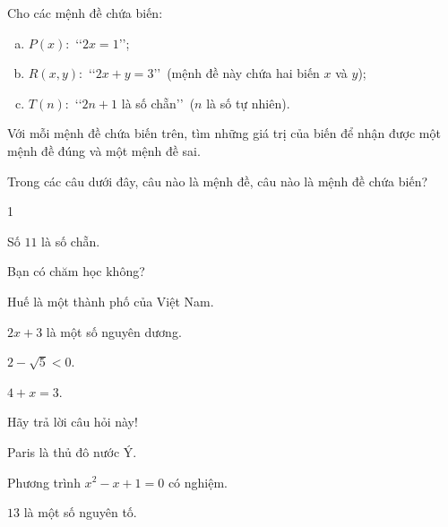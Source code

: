 \begin{bt}%
	Cho  các mệnh đề chứa biến:
	\begin{enumerate}[a)]
		\item $P(x)\colon$ \lq\lq$2x=1$\rq\rq; 
		\item $R(x,y)\colon$ \lq\lq$2x+y=3$\rq\rq\,  (mệnh đề này chứa hai biến $x$ và $y$);
		\item $T(n)\colon$ \lq\lq $2n+1$ là số chẵn\rq\rq\, ($n$ là số tự nhiên). 
	\end{enumerate}
	Với mỗi mệnh đề chứa biến  trên, tìm những giá trị của biến để nhận được một mệnh đề đúng và một mệnh đề sai.
\end{bt}

\begin{bt}%
	Trong các câu dưới đây, câu nào là mệnh đề, câu nào là mệnh đề  chứa biến?
	\begin{enumEX}{1}
		\item Số $11$ là số  chẵn.
		\item Bạn có chăm học  không?
		\item Huế là một thành phố của Việt Nam. 
		\item  $2x+3$ là một số nguyên dương.
		\item $2-\sqrt{5}<0$. 
		 \item $4+x=3$.
		\item Hãy trả lời câu  hỏi này!
		\item Paris  là thủ đô nước Ý.
		\item Phương  trình $x^2-x+1=0$ có nghiệm.
		\item $13$ là một số nguyên  tố.
	\end{enumEX}
\end{bt}

